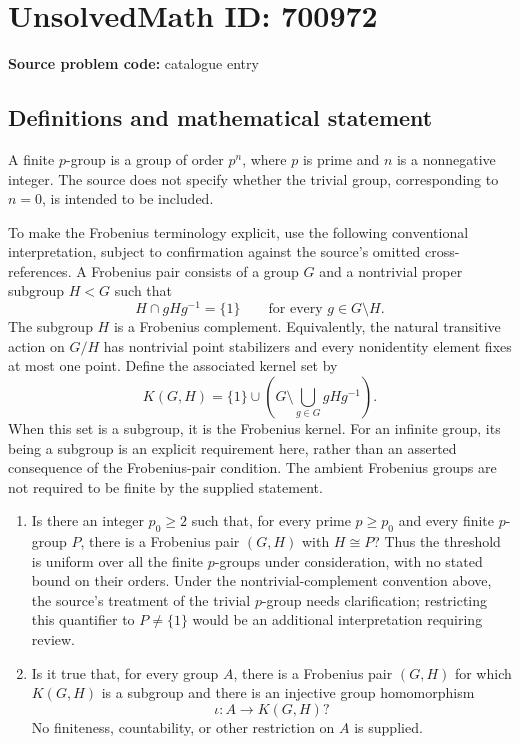 \documentclass[11pt]{article}
\begin{document}
\section*{UnsolvedMath ID: 700972}
\textbf{Source problem code:} catalogue entry
\subsection{Definitions and mathematical statement}
A finite \(p\)-group is a group of order \(p^n\), where \(p\) is prime and \(n\) is a nonnegative integer. The source does not specify whether the trivial group, corresponding to \(n=0\), is intended to be included.

To make the Frobenius terminology explicit, use the following conventional interpretation, subject to confirmation against the source's omitted cross-references. A Frobenius pair consists of a group \(G\) and a nontrivial proper subgroup \(H<G\) such that
\[
H\cap gHg^{-1}=\{1\}\qquad\text{for every }g\in G\setminus H.
\]
The subgroup \(H\) is a Frobenius complement. Equivalently, the natural transitive action on \(G/H\) has nontrivial point stabilizers and every nonidentity element fixes at most one point. Define the associated kernel set by
\[
K(G,H)=\{1\}\cup\left(G\setminus\bigcup_{g\in G}gHg^{-1}\right).
\]
When this set is a subgroup, it is the Frobenius kernel. For an infinite group, its being a subgroup is an explicit requirement here, rather than an asserted consequence of the Frobenius-pair condition. The ambient Frobenius groups are not required to be finite by the supplied statement.

\begin{enumerate}
\item[(a)] Is there an integer \(p_0\geq 2\) such that, for every prime \(p\geq p_0\) and every finite \(p\)-group \(P\), there is a Frobenius pair \((G,H)\) with \(H\cong P\)? Thus the threshold is uniform over all the finite \(p\)-groups under consideration, with no stated bound on their orders. Under the nontrivial-complement convention above, the source's treatment of the trivial \(p\)-group needs clarification; restricting this quantifier to \(P\ne\{1\}\) would be an additional interpretation requiring review.
\item[(b)] Is it true that, for every group \(A\), there is a Frobenius pair \((G,H)\) for which \(K(G,H)\) is a subgroup and there is an injective group homomorphism
\[
\iota:A\longrightarrow K(G,H)?
\]
No finiteness, countability, or other restriction on \(A\) is supplied.
\end{enumerate}
\end{document}
